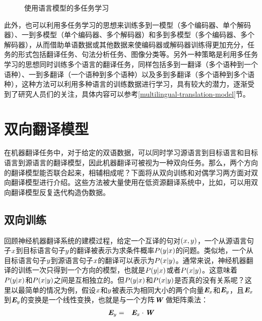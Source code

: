 \begin{figure}[htp]
\centering

\caption{使用语言模型的多任务学习}
\label{fig:16-8}
\end{figure}

\parinterval 此外，也可以利用多任务学习的思想来训练多到一模型（多个编码器、单个解码器）、一到多模型（单个编码器、多个解码器）和多到多模型（多个编码器、多个解码器），从而借助单语数据或其他数据来使编码器或解码器训练得更加充分，任务的形式包括翻译任务、句法分析任务、图像分类等。另外一种策略是利用多任务学习的思想同时训练多个语言的翻译任务，同样包括多到一翻译（多个语种到一个语种）、一到多翻译（一个语种到多个语种）以及多到多翻译（多个语种到多个语种），这种方法可以利用多种语言的训练数据进行学习，具有较大的潜力，逐渐受到了研究人员们的关注，具体内容可以参考\ref{multilingual-translation-model}节。


\section{双向翻译模型}

\parinterval 在机器翻译任务中，对于给定的双语数据，可以同时学习源语言到目标语言和目标语言到源语言的翻译模型，因此机器翻译可被视为一种双向任务。那么，两个方向的翻译模型能否联合起来，相辅相成呢？下面将从双向训练和对偶学习两方面对双向翻译模型进行介绍。这些方法被大量使用在低资源翻译系统中，比如，可以用双向翻译模型反复迭代构造伪数据。

\subsection{双向训练}

\parinterval 回顾神经机器翻译系统的建模过程，给定一个互译的句对$({x},{y})$，一个从源语言句子${x}$到目标语言句子${y}$的翻译被表示为求条件概率${P}({y}|{x})$的问题。类似地，一个从目标语言句子${y}$到源语言句子${x}$的翻译可以表示为${P}({x}|{y})$。通常来说，神经机器翻译的训练一次只得到一个方向的模型，也就是${P}({y}|{x})$或者${P}({x}|{y})$。这意味着${P}({y}|{x})$和${P}({x}|{y})$之间是互相独立的。但${P}({y}|{x})$和${P}({x}|{y})$是否真的没有关系呢？这里以最简单的情况为例，假设${x}$和${y}$被表示为相同大小的两个向量$\textbf{\em E}_x$和$\textbf{\em E}_y$，且$\textbf{\em E}_x$到$\textbf{\em E}_y$的变换是一个线性变换，也就是与一个方阵$\textbf{\em W}$ 做矩阵乘法：
\begin{eqnarray}
\textbf{\em E}_y & = & \textbf{\em E}_x \cdot \textbf{\em W}
\label{eq:16-2}
\end{eqnarray}

